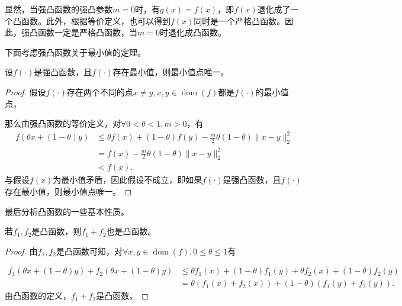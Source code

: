显然，当强凸函数的强凸参数$m=0$时，有$g(x)=f(x)$，即$f(x)$退化成了一个凸函数。此外，根据等价定义，也可以得到$f(x)$同时是一个严格凸函数。因此，强凸函数一定是严格凸函数，当$m=0$时退化成凸函数。

下面考虑强凸函数关于最小值的定理。

\begin{theorem}
    设$f(\cdot)$是强凸函数，且$f(\cdot)$存在最小值，则最小值点唯一。
\end{theorem}
\begin{proof}
    假设$f(\cdot)$存在两个不同的点$x\neq y, x, y\in \mathop{\mathrm{dom}} (f)$都是$f(\cdot)$的最小值点，

    那么由强凸函数的等价定义，对$\forall 0<\theta<1, m>0$，有
    \begin{equation*}
        \begin{split}
            f(\theta x + (1-\theta)y) &\leq \theta f(x) + (1-\theta)f(y) - \frac{m}{2}\theta(1-\theta)\|x-y\|_{2}^{2} \\
            &= f(x) - \frac{m}{2}\theta(1-\theta)\|x-y\|_{2}^{2} \\
            &< f(x) .
        \end{split}
    \end{equation*}
与假设$f(x)$为最小值矛盾，因此假设不成立，即如果$f(\cdot)$是强凸函数，且$f(\cdot)$存在最小值，则最小值点唯一。
\end{proof}

最后分析凸函数的一些基本性质。
\begin{theorem}
    若$f_{1}, f_{2}$是凸函数，则$f_{1}+f_{2}$也是凸函数。
\end{theorem}
\begin{proof}
    由$f_{1}, f_{2}$是凸函数可知，对$\forall x, y\in \mathop{\mathrm{dom}} (f), 0\leq \theta \leq 1$有

    \begin{equation*}
        \begin{split}
            f_{1}(\theta x+(1-\theta)y)+f_{2}(\theta x+(1-\theta)y) &\leq \theta f_{1}(x)+(1-\theta)f_{1}(y) + \theta f_{2}(x)+(1-\theta)f_{2}(y) \\
            &=\theta(f_{1}(x)+f_{2}(x)) + (1-\theta)(f_{1}(y)+f_{2}(y)) .
        \end{split}
    \end{equation*}
    由凸函数的定义，$f_{1}+f_{2}$是凸函数。
\end{proof}

